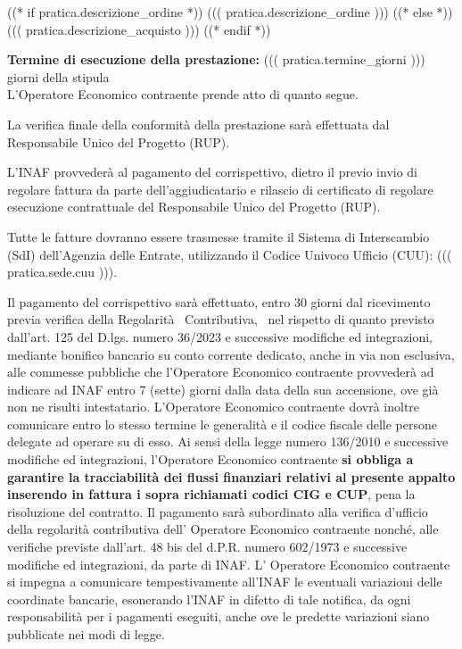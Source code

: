 
((* if pratica.descrizione_ordine *))
((( pratica.descrizione_ordine )))
((* else *))
((( pratica.descrizione_acquisto )))
((* endif *))



\textbf{Termine di esecuzione della prestazione:} ((( pratica.termine_giorni ))) giorni della stipula \\

L'Operatore Economico contraente prende atto di quanto segue.

La verifica finale della conformità della prestazione sarà effettuata
dal Responsabile Unico del Progetto (RUP).

L'INAF provvederà al pagamento del corrispettivo, dietro il previo
invio di regolare fattura da parte dell'aggiudicatario e rilascio di
certificato di regolare esecuzione contrattuale del Responsabile Unico
del Progetto (RUP).

Tutte le fatture dovranno essere trasmesse tramite il Sistema di
Interscambio (SdI) dell'Agenzia delle Entrate, utilizzando il Codice
Univoco Ufficio (CUU): ((( pratica.sede.cuu ))).

Il pagamento del corrispettivo sarà effettuato, entro 30 giorni dal
ricevimento previa verifica della Regolarità  Contributiva,  nel
rispetto di quanto previsto dall'art. 125 del D.lgs. numero 36/2023 e
successive modifiche ed integrazioni, mediante bonifico bancario su conto
corrente dedicato, anche in via non esclusiva, alle commesse pubbliche che
l'Operatore Economico contraente provvederà ad indicare ad INAF entro 7
(sette) giorni dalla data della sua accensione, ove già non ne risulti
intestatario. L'Operatore Economico contraente dovrà inoltre comunicare
entro lo stesso termine le generalità e il codice fiscale delle persone
delegate ad operare su di esso. Ai sensi della legge numero 136/2010 e
successive modifiche ed integrazioni, l'Operatore Economico contraente
\textbf{si obbliga a garantire la tracciabilità dei flussi finanziari relativi al
presente appalto inserendo in fattura i sopra richiamati codici CIG e CUP},
pena la risoluzione del contratto. Il pagamento sarà subordinato alla
verifica d'ufficio della regolarità contributiva dell' Operatore
Economico contraente nonché, alle verifiche previste dall'art. 48
bis del d.P.R. numero 602/1973 e successive modifiche ed integrazioni,
da parte di INAF. L' Operatore Economico contraente si impegna a
comunicare tempestivamente all'INAF le eventuali variazioni delle
coordinate bancarie, esonerando l'INAF in difetto di tale notifica,
da ogni responsabilità per i pagamenti eseguiti, anche ove le predette
variazioni siano pubblicate nei modi di legge.


